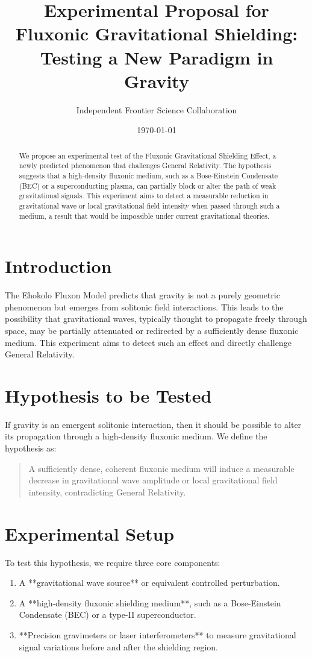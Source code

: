 \documentclass{article}
\title{Experimental Proposal for Fluxonic Gravitational Shielding: Testing a New Paradigm in Gravity}
\author{Independent Frontier Science Collaboration}
\date{\today}
\begin{document}
\maketitle

\begin{abstract}
We propose an experimental test of the Fluxonic Gravitational Shielding Effect, a newly predicted phenomenon that challenges General Relativity. The hypothesis suggests that a high-density fluxonic medium, such as a Bose-Einstein Condensate (BEC) or a superconducting plasma, can partially block or alter the path of weak gravitational signals. This experiment aims to detect a measurable reduction in gravitational wave or local gravitational field intensity when passed through such a medium, a result that would be impossible under current gravitational theories.
\end{abstract}

\section{Introduction}
The Ehokolo Fluxon Model predicts that gravity is not a purely geometric phenomenon but emerges from solitonic field interactions. This leads to the possibility that gravitational waves, typically thought to propagate freely through space, may be partially attenuated or redirected by a sufficiently dense fluxonic medium. This experiment aims to detect such an effect and directly challenge General Relativity.

\section{Hypothesis to be Tested}
If gravity is an emergent solitonic interaction, then it should be possible to alter its propagation through a high-density fluxonic medium. We define the hypothesis as:
\begin{quote}
A sufficiently dense, coherent fluxonic medium will induce a measurable decrease in gravitational wave amplitude or local gravitational field intensity, contradicting General Relativity.
\end{quote}

\section{Experimental Setup}
To test this hypothesis, we require three core components:
\begin{enumerate}
    \item A **gravitational wave source** or equivalent controlled perturbation.
    \item A **high-density fluxonic shielding medium**, such as a Bose-Einstein Condensate (BEC) or a type-II superconductor.
    \item **Precision gravimeters or laser interferometers** to measure gravitational signal variations before and after the shielding region.
\end{enumerate}
\end{document}

